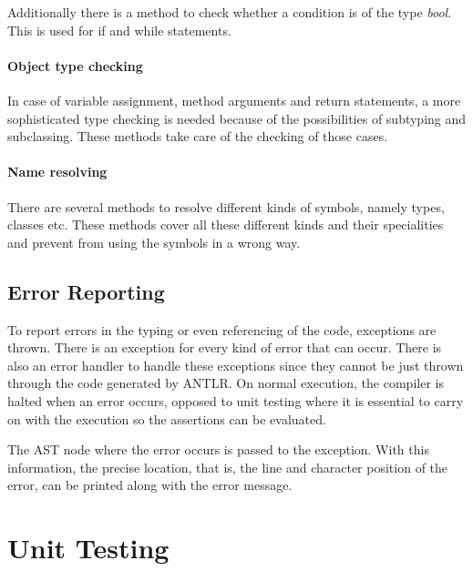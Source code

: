 Additionally there is a method to check whether a condition is of
the type \emph{bool}. This is used for if and while statements.

\paragraph{Object type checking}
In case of variable assignment, method arguments and return statements,
a more sophisticated type checking is needed because of the possibilities
of subtyping and subclassing. These methods take care of the checking
of those cases.

\paragraph{Name resolving}
There are several methods to resolve different kinds of symbols, namely
types, classes etc. These methods cover all these different kinds and their
specialities and prevent from using the symbols in a wrong way.

%
%

\subsection{Error Reporting}

To report errors in the typing or even referencing of the code, exceptions
are thrown. There is an exception for every kind of error that can occur.
There is also an error handler to handle these exceptions since they cannot
be just thrown through the code generated by ANTLR. On normal execution,
the compiler is halted when an error occurs, opposed to unit testing where
it is essential to carry on with the execution so the assertions can be
evaluated.

The AST node where the error occurs is passed to the exception. With this
information, the precise location, that is, the line and character position
of the error, can be printed along with the error message.

\section{Unit Testing}
